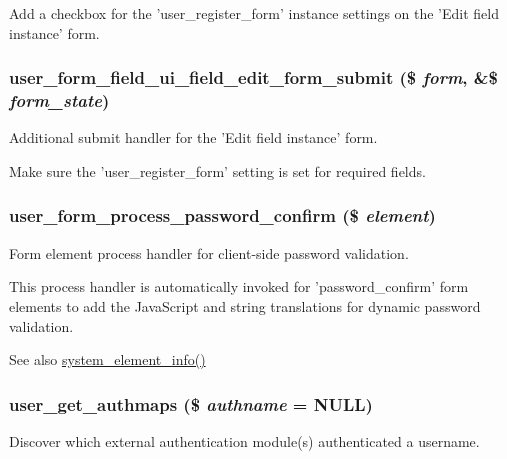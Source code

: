 Add a checkbox for the 'user\_\-register\_\-form' instance settings on the 'Edit field instance' form. \hypertarget{user_8module_a965286b291d94cac41246d7f350d4214}{
\subsubsection[{user\_\-form\_\-field\_\-ui\_\-field\_\-edit\_\-form\_\-submit}]{\setlength{\rightskip}{0pt plus 5cm}user\_\-form\_\-field\_\-ui\_\-field\_\-edit\_\-form\_\-submit (\$ {\em form}, \/  \&\$ {\em form\_\-state})}}
\label{user_8module_a965286b291d94cac41246d7f350d4214}
Additional submit handler for the 'Edit field instance' form.

Make sure the 'user\_\-register\_\-form' setting is set for required fields. \hypertarget{user_8module_ae2f4fd0c6769e59e37bf1a13e5f2a4cd}{
\subsubsection[{user\_\-form\_\-process\_\-password\_\-confirm}]{\setlength{\rightskip}{0pt plus 5cm}user\_\-form\_\-process\_\-password\_\-confirm (\$ {\em element})}}
\label{user_8module_ae2f4fd0c6769e59e37bf1a13e5f2a4cd}
Form element process handler for client-\/side password validation.

This process handler is automatically invoked for 'password\_\-confirm' form elements to add the JavaScript and string translations for dynamic password validation.

\begin{DoxySeeAlso}{See also}
\hyperlink{system_8module_a39faa9a5430a70bb37a3c8af72460a14}{system\_\-element\_\-info()} 
\end{DoxySeeAlso}
\hypertarget{user_8module_a71f0c8ed86c79dc3000478b2c62ec31c}{
\subsubsection[{user\_\-get\_\-authmaps}]{\setlength{\rightskip}{0pt plus 5cm}user\_\-get\_\-authmaps (\$ {\em authname} = {\ttfamily NULL})}}
\label{user_8module_a71f0c8ed86c79dc3000478b2c62ec31c}
Discover which external authentication module(s) authenticated a username.


